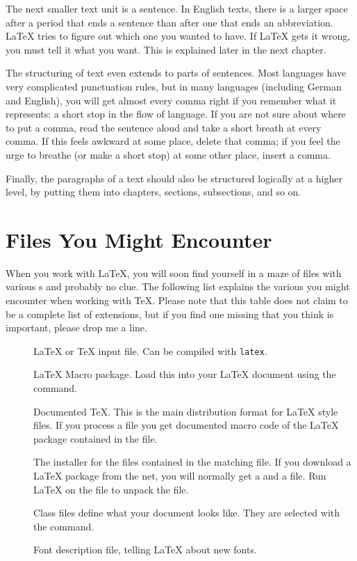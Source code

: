 The next smaller text unit is a sentence.  In English texts, there is
a larger space after a period that ends a sentence than after one
that ends an abbreviation.  \LaTeX{} tries to figure out which one
you wanted to have.  If \LaTeX{} gets it wrong, you must tell it what
you want.  This is explained later in the next chapter.

The structuring of text even extends to parts of sentences.  Most
languages have very complicated punctuation rules, but in many
languages (including German and English), you will get almost every
comma right if you remember what it represents: a short stop in the
flow of language.  If you are not sure about where to put a comma,
read the sentence aloud and take a short breath at every comma.  If
this feels awkward at some place, delete that comma; if you feel the
urge to breathe (or make a short stop) at some other place, insert a
comma.

Finally, the paragraphs of a text should also be structured logically at a
higher level, by putting them into chapters, sections, subsections, and so on.

\section{Files You Might Encounter}

When you work with \LaTeX{}, you will soon find yourself in a maze of
files with various s and probably no clue. The following
list explains the various  you might encounter when
working with \TeX{}. Please note that this table does not claim to be
a complete list of extensions, but if you find one missing that you
think is important, please drop me a line.

\begin{description}

  \item[] \LaTeX{} or \TeX{} input file. Can be compiled with
    \texttt{latex}.
  \item[] \LaTeX{} Macro package. Load this
    into your \LaTeX{} document using the  command.
  \item[] Documented \TeX{}. This is the main distribution
    format for \LaTeX{} style files. If you process a  file you get
    documented macro code of the \LaTeX{} package contained in the 
    file.
  \item[] The installer for the files contained in the
    matching  file. If you download a \LaTeX{} package from the net,
    you will normally get a  and a  file. Run \LaTeX{} on the
     file to unpack the  file.
  \item[] Class files define what your document looks
    like. They are selected with the  command.
  \item[] Font description file, telling  \LaTeX{} about new fonts.
\end{description}

